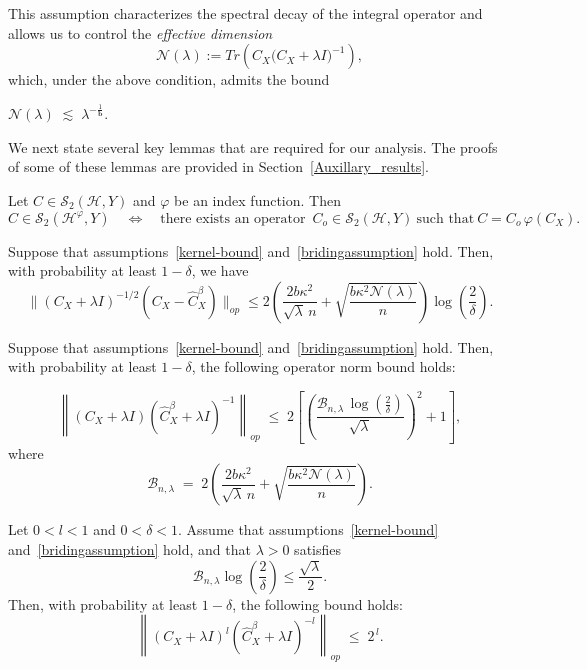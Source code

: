 \documentclass[twoside,11pt]{article}
\begin{document}
\noindent
This assumption characterizes the spectral decay of the integral operator and allows us to control the \emph{effective dimension}
\[
\mathcal{N}(\lambda) 
:= 
{Tr}\!\left(C_X\big(C_X + \lambda I\big)^{-1}
\right),
\]
which, under the above condition, admits the bound
\begin{center}
$\mathcal{N}(\lambda) \;\lesssim\; \lambda^{-\frac{1}{\mathbf{b}}}.
$
\end{center}



\noindent
We next state several key lemmas that are required for our analysis. The proofs of some of these lemmas are provided in Section~\ref{Auxillary_results}.


\begin{lemma}\label{Lemma:3}
Let \(C \in \mathcal{S}_2(\mathcal{H},Y)\) and $\varphi$ be an index function. Then
\[
C \in \mathcal{S}_2(\mathcal{H}^{\varphi},Y)
\quad\iff\quad
\text{there exists an operator } \, C_o \in \mathcal{S}_2(\mathcal{H},Y)
\ \text{such that}\
C = C_o\,\varphi(C_X).
\] 
\end{lemma}


\begin{lemma}\label{Lemma:1}

Suppose that assumptions~\ref{kernel-bound} and~\ref{bridingassumption} hold. Then, with probability at least \(1-\delta\), we have    \[
    \big\|(C_{X}+\lambda I)^{-1/2} (C_X -\widehat{C}_X^\beta)\big\|_{op} \leq 2\left(\frac{2b\kappa^2}{\sqrt \lambda\, n} +\sqrt{\frac{b\kappa^2\mathcal{N}(\lambda)}{n}} \right) \log \left(\frac{2}{\delta}\right).
\]
\end{lemma}


\begin{lemma}\label{Lemma:2}
Suppose that assumptions~\ref{kernel-bound} and~\ref{bridingassumption} hold. Then, with probability at least \(1-\delta\), the following operator norm bound holds:



\[
\left\|(C_X+\lambda I)(\widehat{C}_X^{\beta}+\lambda I)^{-1}\right\|_{{op}}
\;\leq\;
2\left[
\left(
\frac{\mathcal{B}_{n,\lambda}\,\log\!\left(\frac{2}{\delta}\right)}{\sqrt{\lambda}}
\right)^2
+1
\right],
\]
where
\[
\mathcal{B}_{n,\lambda}
\;=\;
2\left(
\frac{2b\kappa^2}{\sqrt{\lambda}\,n}
+
\sqrt{\frac{b\kappa^2\mathcal{N}(\lambda)}{n}}
\right).
\]
\end{lemma}




\begin{lemma}\label{lemma:5}
Let $0<l<1$ and $0<\delta<1$. Assume that assumptions~\ref{kernel-bound} and~\ref{bridingassumption} hold, and that \(\lambda > 0\) satisfies
\begin{equation}\label{eq:condition_on_lambda}
\mathcal{B}_{n,\lambda}
\log\!\left(\frac{2}{\delta}\right)\leq \frac{\sqrt{\lambda}}{2}.
\end{equation}
Then, with probability at least $1-\delta$, the following bound holds:
\[
\left\|
(C_X+\lambda I)^l(\widehat{C}^\beta_X+\lambda I)^{-l}
\right\|_{{op}}
\;\le\;
2^{\,l}.
\]
\end{lemma}
\end{document}
